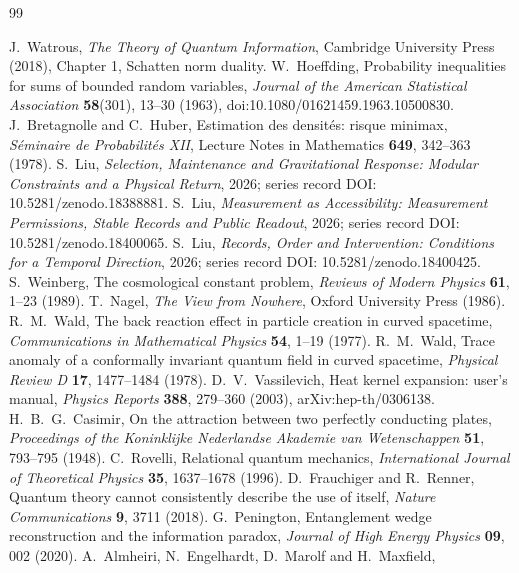 \documentclass[12pt,a4paper]{article}
\theoremstyle{definition}
\begin{document}
\begin{thebibliography}{99}
\raggedright
{} J.~Watrous, \emph{The Theory of Quantum Information}, Cambridge University Press (2018), Chapter 1, Schatten norm duality.
 W.~Hoeffding, Probability inequalities for sums of bounded random variables,
\emph{Journal of the American Statistical Association} \textbf{58}(301), 13--30 (1963), doi:10.1080/01621459.1963.10500830.
 J.~Bretagnolle and C.~Huber, Estimation des densit\'es: risque minimax,
\emph{S\'eminaire de Probabilit\'es XII}, Lecture Notes in Mathematics \textbf{649}, 342--363 (1978).
 S.~Liu, \emph{Selection, Maintenance and Gravitational Response: Modular Constraints and a Physical Return}, 2026; series record DOI: 10.5281/zenodo.18388881.
 S.~Liu, \emph{Measurement as Accessibility: Measurement Permissions, Stable Records and Public Readout}, 2026; series record DOI: 10.5281/zenodo.18400065.
 S.~Liu, \emph{Records, Order and Intervention: Conditions for a Temporal Direction}, 2026; series record DOI: 10.5281/zenodo.18400425.
 S.~Weinberg, The cosmological constant problem,
\emph{Reviews of Modern Physics} \textbf{61}, 1--23 (1989).
 T.~Nagel, \emph{The View from Nowhere}, Oxford University Press (1986).
 R.~M.~Wald, The back reaction effect in particle creation in curved spacetime,
\emph{Communications in Mathematical Physics} \textbf{54}, 1--19 (1977).
 R.~M.~Wald, Trace anomaly of a conformally invariant quantum field in curved spacetime,
\emph{Physical Review D} \textbf{17}, 1477--1484 (1978).
 D.~V.~Vassilevich, Heat kernel expansion: user's manual,
\emph{Physics Reports} \textbf{388}, 279--360 (2003), arXiv:hep-th/0306138.
 H.~B.~G.~Casimir, On the attraction between two perfectly conducting plates,
\emph{Proceedings of the Koninklijke Nederlandse Akademie van Wetenschappen} \textbf{51}, 793--795 (1948).
 C.~Rovelli, Relational quantum mechanics,
\emph{International Journal of Theoretical Physics} \textbf{35}, 1637--1678 (1996).
 D.~Frauchiger and R.~Renner, Quantum theory cannot consistently describe the use of itself,
\emph{Nature Communications} \textbf{9}, 3711 (2018).
 G.~Penington, Entanglement wedge reconstruction and the information paradox,
\emph{Journal of High Energy Physics} \textbf{09}, 002 (2020).
 A.~Almheiri, N.~Engelhardt, D.~Marolf and H.~Maxfield,

\end{thebibliography}
\end{document}
